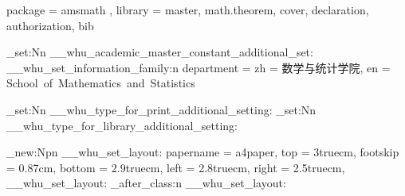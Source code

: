 \WHUDependency 
  {
    package = { amsmath },
    library = { master, math.theorem, cover, declaration, authorization, bib }
  }




\cs_set:Nn \__whu_academic_master_constant_additional_set:
  {
    \__whu_set_information_family:n
      {
        department =
          {
            zh = 数学与统计学院,
            en = School~of~Mathematics~and~Statistics
          }
      }
  }






\cs_set:Nn \__whu_type_for_print_additional_setting: 
  {
      { \hypersetup { allcolors = black } }
  }
\cs_set:Nn \__whu_type_for_library_additional_setting: 
  {
      { \hypersetup { allcolors = black } }
  }


\cs_new:Npn \__whu_set_layout:
  {
    \setuplayout
      {
        papername = a4paper,
        top       = 3truecm,
        footskip  = 0.87cm,  %
        bottom    = 2.9truecm,
        left      = 2.8truecm,
        right     = 2.5truecm,
      }
  }
  { \__whu_set_layout: }
  { \whu_after_class:n { \__whu_set_layout: } }



